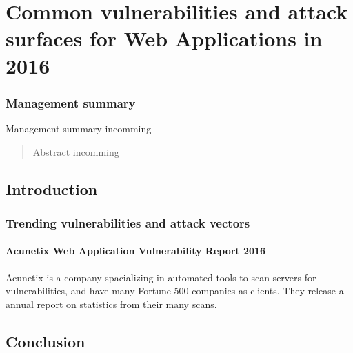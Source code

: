 \chapter[Web Applications in 2016]{Common vulnerabilities and attack surfaces for Web Applications in 2016}

\subsection*{Management summary}
Management summary incomming
 
\begin{abstract}
Abstract incomming
\end{abstract}


\section{Introduction}
\subsection{Trending vulnerabilities and attack vectors}
\subsubsection{Acunetix Web Application Vulnerability Report 2016}
Acunetix is a company spacializing in automated tools to scan servers for vulnerabilities, and have many Fortune 500 companies as clients. They release a annual report on statistics from their many scans.  
\section{Conclusion}



